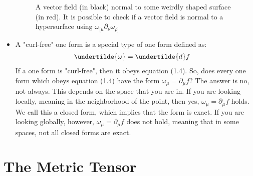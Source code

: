 \documentclass[11pt]{article}
\begin{document}
\begin{itemize}
\begin{figure} [H]
\begin{center}
\begin{tikzpicture}[x=0.75pt,y=0.75pt,yscale=-1,xscale=1]
\end{tikzpicture}
        \caption{A vector field (in black) normal to some weirdly shaped surface (in red). It is possible to check if a vector field is normal to a hypersurface using $\omega_{[\mu} \partial_\nu \omega_{\rho]}$}
            \end{center}
    \end{figure}
    
    \item
    A "curl-free" one form is a special type of one form defined as:
        \begin{equation}
            \begin{aligned}
            \undertilde{\omega} &= \undertilde{d}f
            \end{aligned}
        \end{equation}
    If a one form is "curl-free", then it obeys equation (1.4). So, does every one form which obeys equation (1.4) have the form $\omega_\mu = \partial_\mu f$? 
    The answer is no, not always. This depends on the space that you are in. If you are looking locally, meaning in the neighborhood of the point, then yes, $\omega_\mu = \partial_\mu f$ holds. We call this a closed form, which implies that the form is exact. If you are looking globally, however, $\omega_\mu = \partial_\mu f$ does not hold, meaning that in some spaces, not all closed forms are exact.
    \end{itemize}

\newpage

\part{The Metric Tensor}
\end{document}

